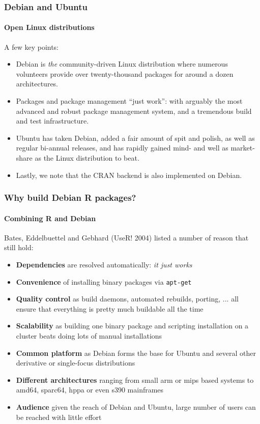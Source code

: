 \documentclass[smaller,compress]{beamer}
\begin{document}
\begin{frame}
  \frametitle{Debian and Ubuntu} %
  \framesubtitle{Open Linux distributions}

  A few key points:
  \begin{itemize} 
  \item Debian is \textsl{the} community-driven Linux distribution where
    numerous volunteers provide over twenty-thousand packages for around
    a dozen architectures.
  \item Packages and package management ``just work'': with arguably the most
    advanced and robust package management system, and a tremendous
    build and test infrastructure.
  \item Ubuntu has taken Debian, added a fair amount of spit and polish, as
    well as regular bi-annual releases, and has rapidly gained mind- and
    well as market-share as the Linux distribution to beat.
  \item Lastly, we note that the CRAN backend is also implemented on Debian.
  \end{itemize}
\end{frame}

\begin{frame}
  \frametitle{Why build Debian R packages?}
  \framesubtitle{Combining R and Debian}
  Bates, Eddelbuettel and Gebhard (UseR! 2004) listed a number of reason
  that still hold:
  \begin{itemize} 
  \item \textbf{Dependencies} are resolved automatically: \textsl{it just
      works}
  \item \textbf{Convenience} of installing binary packages via
    \texttt{apt-get} %
  \item \textbf{Quality control} as build daemons, automated rebuilds,
    porting, ... all ensure that everything is pretty much buildable all the
    time
  \item \textbf{Scalability} as building one binary package and scripting
    installation on a cluster beats doing lots of manual installations
  \item \textbf{Common platform} as Debian forms the base for Ubuntu and
    several other derivative or single-focus distributions
  \item \textbf{Different architectures} ranging from small arm or mips based
    systems to amd64, sparc64, hppa or even s390 mainframes
  \item \textbf{Audience} given the reach of Debian and Ubuntu, large number
    of users can be reached with little effort
  \end{itemize}

\end{frame}
\end{document}
